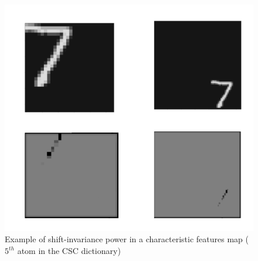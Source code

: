 \begin{figure}[h]
 \centering
 \includegraphics[scale=0.8]{CSC_Proof.png}
 \caption{Example of shift-invariance power in a characteristic features map ($5^{th}$ atom in the CSC dictionary)}
 \label{fig:CSCproof}
\end{figure}

